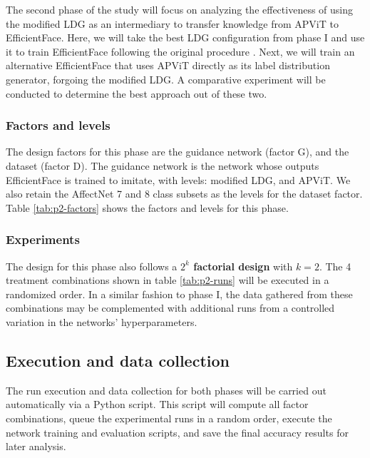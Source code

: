 \documentclass[../main.tex]{subfiles}
\begin{document}
The second phase of the study will focus on analyzing the effectiveness of using the modified LDG as an intermediary to transfer knowledge from APViT to EfficientFace.
Here, we will take the best LDG configuration from phase I and use it to train EfficientFace following the original procedure \cite{eff-face2021}.
Next, we will train an alternative EfficientFace that uses APViT directly as its label distribution generator, forgoing the modified LDG.
A comparative experiment will be conducted to determine the best approach out of these two.

\subsubsection{Factors and levels}

The design factors for this phase are the guidance network (factor G), and the dataset (factor D).
The guidance network is the network whose outputs EfficientFace is trained to imitate, with levels: modified LDG, and APViT.
We also retain the AffectNet 7 and 8 class subsets as the levels for the dataset factor.
Table \ref{tab:p2-factors} shows the factors and levels for this phase.



\subsubsection{Experiments}

The design for this phase also follows a \textbf{$2^k$ factorial design} with $k=2$.
The 4 treatment combinations shown in table \ref{tab:p2-runs} will be executed in a randomized order.
In a similar fashion to phase I, the data gathered from these combinations may be complemented with additional runs from a controlled variation in the networks' hyperparameters.



\subsection{Execution and data collection}

The run execution and data collection for both phases will be carried out automatically via a Python script. This script will compute all factor combinations, queue the experimental runs in a random order, execute the network training and evaluation scripts, and save the final accuracy results for later analysis.
\end{document}
